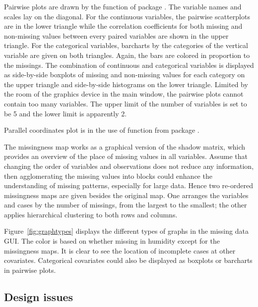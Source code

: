 \documentclass[article]{jss}
\begin{document}
Pairwise plots are drawn by the function  of package  \citep{ggally}. The variable names and scales lay on the diagonal. For the continuous variables, the pairwise scatterplots are in the lower triangle while the correlation coefficients for both missing and non-missing values between every paired variables are shown in the upper triangle. For the categorical variables, barcharts by the categories of the vertical variable are given on both triangles. Again, the bars are colored in proportion to the missings. The combination of continuous and categorical variables is displayed as side-by-side boxplots of missing and non-missing values for each category on the upper triangle and side-by-side histograms on the lower triangle. Limited by the room of the graphics device in the main window, the pairwise plots cannot contain too many variables. The upper limit of the number of variables is set to be 5 and the lower limit is apparently 2.

Parallel coordinates plot is in the use of function  from package  \citep{ggplot2}.

The missingness map works as a graphical version of the shadow matrix, which provides an overview of the place of missing values in all variables. Assume that changing the order of variables and observations does not reduce any information, then agglomerating the missing values into blocks could enhance the understanding of missing patterns, especially for large data. Hence two re-ordered missingness maps are given besides the original map. One arranges the variables and cases by the number of missings, from the largest to the smallest; the other applies hierarchical clustering to both rows and columns.

Figure~\ref{fig:graphtypes} displays the different types of graphs in the missing data GUI. The color is based on whether missing in humidity except for the missingness maps. It is clear to see the location of incomplete cases at other covariates. Categorical covariates could also be displayed as boxplots or barcharts in pairwise plots. 

\subsection{Design issues}
\end{document}
